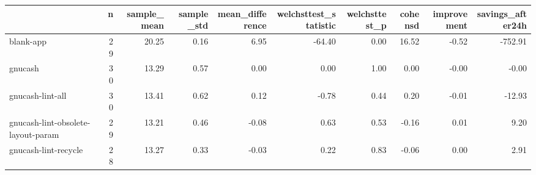\begin{tabular}{lrrrrrrrrr}
\toprule
{} &   n &  sample\_mean &  sample\_std &  mean\_difference &  welchsttest\_statistic &  welchsttest\_p &  cohensd &  improvement &  savings\_after24h \\
\midrule
blank-app                          &  29 &        20.25 &        0.16 &             6.95 &                 -64.40 &           0.00 &    16.52 &        -0.52 &           -752.91 \\
gnucash                            &  30 &        13.29 &        0.57 &             0.00 &                   0.00 &           1.00 &     0.00 &        -0.00 &             -0.00 \\
gnucash-lint-all                   &  30 &        13.41 &        0.62 &             0.12 &                  -0.78 &           0.44 &     0.20 &        -0.01 &            -12.93 \\
gnucash-lint-obsolete-layout-param &  29 &        13.21 &        0.46 &            -0.08 &                   0.63 &           0.53 &    -0.16 &         0.01 &              9.20 \\
gnucash-lint-recycle               &  28 &        13.27 &        0.33 &            -0.03 &                   0.22 &           0.83 &    -0.06 &         0.00 &              2.91 \\
\bottomrule
\end{tabular}
